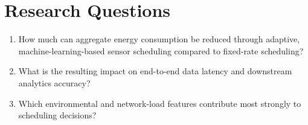 \section{Research Questions}

\begin{enumerate}[label=RQ\arabic*.]
  \item How much can aggregate energy consumption be reduced through adaptive, machine-learning-based
        sensor scheduling compared to fixed-rate scheduling?
  \item What is the resulting impact on end-to-end data latency and downstream analytics accuracy?
  \item Which environmental and network-load features contribute most strongly to scheduling
        decisions?
\end{enumerate}

